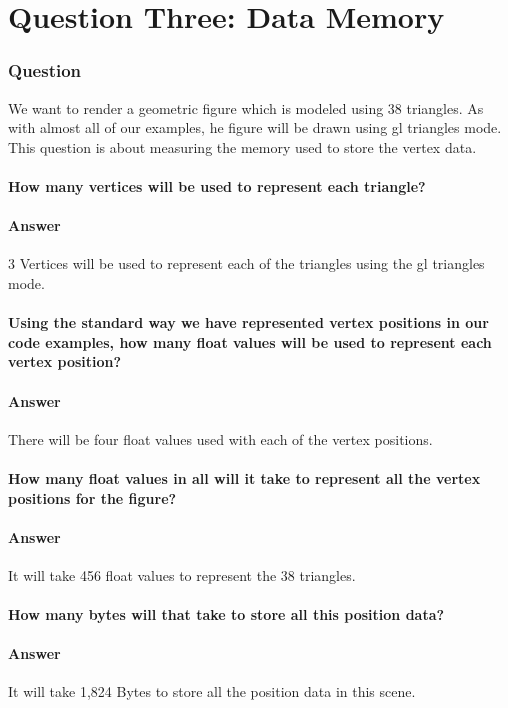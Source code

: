 \documentclass{report}
\begin{document}
\part{Question Three: Data Memory}
\section{Question}
We want to render a geometric figure which is modeled using 38 triangles.
As with almost all of our examples, he figure will be drawn using gl triangles mode. This question is about measuring the memory used to store the vertex data.
\subsection{ How many vertices will be used to represent each triangle?}
\subsection{Answer}
3 Vertices will be used to represent each of the triangles using the gl triangles mode.
\subsection{ Using the standard way we have represented vertex positions in our code examples, how many float values will be used to represent each vertex position?
}
\subsection{Answer}
There will be four float values used with each of the vertex positions.
\subsection{ How many float values in all will it take to represent all the vertex positions for the figure?
}
\subsection{Answer}
It will take 456 float values to represent the 38 triangles.
\subsection{ How many bytes will that take to store all this position data?
}
\subsection{Answer}
It will take 1,824 Bytes to store all the position data in this scene.
\end{document}
